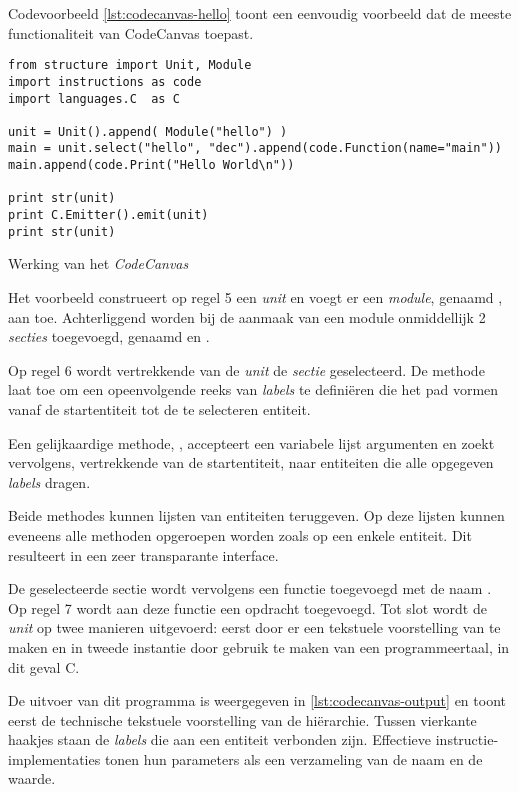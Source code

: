 Codevoorbeeld \ref{lst:codecanvas-hello} toont een eenvoudig voorbeeld dat de
meeste functionaliteit van CodeCanvas toepast. 

\begin{listing}[ht]
  \begin{verbatim}
from structure import Unit, Module
import instructions as code
import languages.C  as C

unit = Unit().append( Module("hello") )
main = unit.select("hello", "dec").append(code.Function(name="main"))
main.append(code.Print("Hello World\n"))

print str(unit)
print C.Emitter().emit(unit)
print str(unit)
  \end{verbatim}
  \vspace{-5mm}
  \caption{Werking van het \emph{CodeCanvas}}
  \label{lst:codecanvas-hello}
\end{listing}

Het voorbeeld construeert op regel 5 een \emph{unit} en voegt er een
\emph{module}, genaamd , aan toe. Achterliggend worden bij de
aanmaak van een module onmiddellijk 2 \emph{secties} toegevoegd, genaamd
 en .

Op regel 6 wordt vertrekkende van de \emph{unit} de  \emph{sectie}
geselecteerd. De  methode laat toe om een opeenvolgende reeks van
\emph{labels} te defini\"eren die het pad vormen vanaf de startentiteit tot de
te selecteren entiteit.

Een gelijkaardige methode, , accepteert een variabele lijst
argumenten en zoekt vervolgens, vertrekkende van de startentiteit, naar
entiteiten die alle opgegeven \emph{labels} dragen.

Beide methodes kunnen lijsten van entiteiten teruggeven. Op deze lijsten kunnen
eveneens alle methoden opgeroepen worden zoals op een enkele entiteit. Dit
resulteert in een zeer transparante interface.

De geselecteerde sectie wordt vervolgens een functie toegevoegd met de naam
. Op regel 7 wordt aan deze functie een  opdracht
toegevoegd. Tot slot wordt de \emph{unit} op twee manieren uitgevoerd: eerst
door er een tekstuele voorstelling van te maken en in tweede instantie door
gebruik te maken van een programmeertaal, in dit geval C.

De uitvoer van dit programma is weergegeven in \ref{lst:codecanvas-output} en
toont eerst de technische tekstuele voorstelling van de hi\"erarchie. Tussen
vierkante haakjes staan de \emph{labels} die aan een entiteit verbonden zijn.
Effectieve instructie-implementaties tonen hun parameters als een verzameling
van de naam en de waarde.

